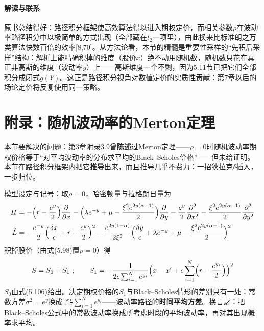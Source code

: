 \paragraph{解读与联系}
原书总结得好：路径积分框架使高效算法得以进入期权定价，而相关参数$\rho$在波动率路径积分中以极简单的方式出现（全部藏在$t_2$一项里），由此换来比标准朗之万类算法快数百倍的效率[8,70]。从方法论看，本节的精髓是重要性采样的“先积后采样”结构：解析上能精确积掉的维度（股价$x$）绝不动用随机数，随机数只花在真正非高斯的维度（波动率$y$）上——高斯维度一个不剩，因为5.11节已把它们全部积分成闭式$g(Y)$。这正是路径积分视角对数值定价的实质性贡献：第7章以后的场论定价将反复使用同一策略。

\section{附录：随机波动率的Merton定理}

本节要解决的问题：第3章附录3.9曾\textbf{陈述}过Merton定理——$\rho=0$时随机波动率期权价格等于“对平均波动率的分布求平均的Black--Scholes价格”——但未给证明。本节在路径积分框架内把它\textbf{推导}出来，而且推导几乎不费力：一招狄拉克$\delta$插入，一步归位。

模型设定与记号：取$\rho=0$，哈密顿量与拉格朗日量为
\begin{align*}
H&=-\Bigl(r-\frac{e^{y}}{2}\Bigr)\frac{\partial}{\partial x}
-\Bigl(\lambda e^{-y}+\mu-\frac{\xi^{2}e^{2y(\alpha-1)}}{2}\Bigr)\frac{\partial}{\partial y}
-\frac{e^{y}}{2}\frac{\partial^{2}}{\partial x^{2}}
-\frac{\xi^{2}e^{2y(\alpha-1)}}{2}\frac{\partial^{2}}{\partial y^{2}}\\
\hat{L}&=-\frac{e^{-y}}{2}\Bigl(\frac{\delta x}{\epsilon}+r-\frac{e^{y}}{2}\Bigr)^{2}
-\frac{e^{2y(1-\alpha)}}{2\xi^{2}}
\Bigl(\frac{\delta y}{\epsilon}+\lambda e^{-y}+\mu-\frac{\xi^{2}e^{2y(\alpha-1)}}{2}\Bigr)^{2}
\end{align*}
积掉股价（由式(5.98)置$\rho=0$）得
\begin{equation*}
S=S_{0}+S_{1}\ ;\qquad
S_{1}=-\frac{1}{2\epsilon\sum_{i=1}^{N}e^{y_i}}
\Bigl(x-x'+\epsilon\sum_{i=1}^{N}\Bigl(r-\frac{e^{y_i}}{2}\Bigr)\Bigr)^{2}
\end{equation*}
$S_0$由式(5.106)给出。决定期权价格的$S_1$与Black--Scholes情形的差别只有一处：常数方差$\sigma^{2}=e^{y}$换成了$\frac{\epsilon}{\tau}\sum_{i=1}^{N}e^{y_i}$——波动率路径的\textbf{时间平均方差}。换言之：把Black--Scholes公式中的常数波动率换成所考虑时段的平均波动率，再对其出现概率求平均。

